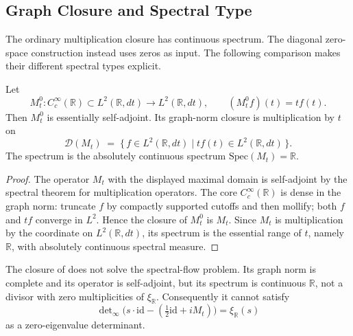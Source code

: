 \subsection{Graph Closure and Spectral Type}
\label{v4-arith:w9-r4:pdnf:execution-attempt}

The ordinary multiplication closure has continuous spectrum.
The diagonal zero-space construction instead uses zeros as input.
The following comparison makes their different spectral types explicit.

\begin{lemma}
\label{v4-arith:w9-r4:lem:meyer-line-graph-closure}
\ClaimStatusProvedHere Let
\[
M_{t}^{0}:C_{c}^{\infty}(\mathbb{R})\subset L^{2}(\mathbb{R},dt)
\longrightarrow L^{2}(\mathbb{R},dt),
\qquad
(M_{t}^{0}f)(t)=t f(t).
\]
Then \(M_{t}^{0}\) is essentially self-adjoint. Its graph-norm
closure is multiplication by \(t\) on
\[
\mathcal{D}(M_{t})
\;=\;
\{\,f\in L^{2}(\mathbb{R},dt)\mid t f(t)\in L^{2}(\mathbb{R},dt)\,\}.
\]
The spectrum is the absolutely continuous spectrum
\(\mathrm{Spec}(M_{t})=\mathbb{R}\).
\end{lemma}

\begin{proof}
The operator \(M_{t}\) with the displayed maximal domain is
self-adjoint by the spectral theorem for multiplication operators.
The core \(C_{c}^{\infty}(\mathbb{R})\) is dense in the graph norm:
truncate \(f\) by compactly supported cutoffs and then mollify; both
\(f\) and \(t f\) converge in \(L^{2}\). Hence the closure of
\(M_{t}^{0}\) is \(M_{t}\). Since \(M_{t}\) is multiplication by the
coordinate on \(L^{2}(\mathbb{R},dt)\), its spectrum is the essential
range of \(t\), namely \(\mathbb{R}\), with absolutely continuous
spectral measure.
\end{proof}

\begin{proposition}
\label{v4-arith:w9-r4:prop:classical-closure-insufficient}
\ClaimStatusProvedHere The closure of
 does not solve
the spectral-flow problem. Its graph norm is complete and its
operator is self-adjoint, but its spectrum is continuous
\(\mathbb{R}\), not a divisor with zero multiplicities of
\(\xi_{\mathbb R}\).
Consequently it cannot satisfy
\[
\det\nolimits_{\infty}
\bigl(s\cdot\mathrm{id}-({\tfrac12}\mathrm{id}+iM_{t})\bigr)
=\xi_{\mathbb{R}}(s)
\]
as a zero-eigenvalue determinant.
\end{proposition}

